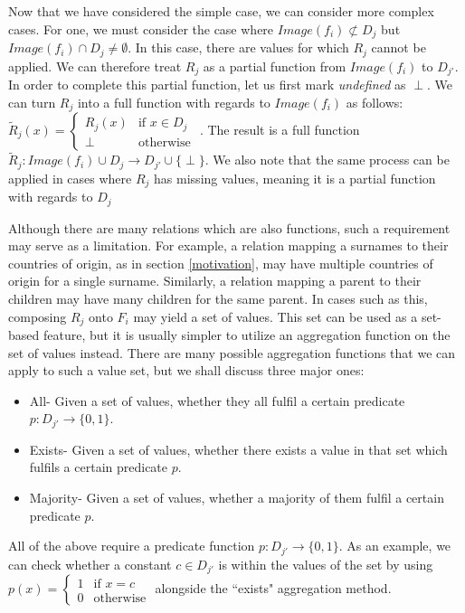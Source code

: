 \documentclass[twoside,11pt]{article}
\theoremstyle{definition}
\begin{document}
Now that we have considered the simple case, we can consider more complex cases.
For one, we must consider the case where $Image(f_i) \not\subset D_j$ but $Image(f_i) \cap D_j \neq\emptyset$. In this case, there are values for which $R_j$ cannot be applied. We can therefore treat $R_j$ as a partial function from $Image(f_i)$ to $D_{j'}$. In order to complete this partial function, let us first mark \emph{undefined} as $\perp$. We can turn $R_j$ into a full function with regards to $Image(f_i)$ as follows: $\tilde{R}_j(x)=\begin{cases} R_j(x) &\mbox{if } x\in D_j\\ 
\perp & \mbox{otherwise } \end{cases}$.
The result is a full function $\tilde{R}_j:Image(f_i)\cup D_j\rightarrow D_{j'}\cup\{\perp\}$. We also note that the same process can be applied in cases where $R_j$  has missing values, meaning it is a partial function with regards to $D_j$

Although there are many relations which are also functions, such a requirement may serve as a limitation. For example, a relation mapping a surnames to their countries of origin, as in section \ref{motivation}, may have multiple countries of origin for a single surname. Similarly, a relation mapping a parent to their children may have many children for the same parent.
In cases such as this, composing $R_j$ onto $F_i$ may yield a set of values. This set can be used as a set-based feature, but it is usually simpler to utilize an aggregation function on the set of values instead. There are many possible aggregation functions that we can apply to such a value set, but we shall discuss three major ones:
\begin{itemize}
	\item All- Given a set of values, whether they all fulfil a certain predicate $p:D_{j'}\rightarrow\{0,1\}$.
	\item Exists- Given a set of values, whether there exists a value in that set which fulfils a certain predicate $p$.
	\item Majority- Given a set of values, whether a majority of them fulfil a certain predicate $p$.
\end{itemize}
All of the above require a predicate function $p:D_{j'}\rightarrow \{0,1\}$.
As an example, we can check whether a constant $c\in D_{j'}$ is within the values of the set by using $p(x)=\begin{cases}
1 & \mbox{if } x=c\\ 0 & \mbox{otherwise}
\end{cases}$ alongside the ``exists" aggregation method.
\end{document}
